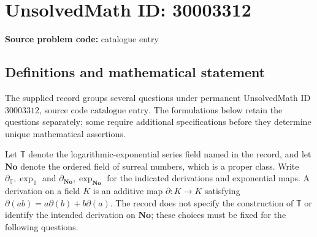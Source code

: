 \documentclass[11pt]{article}
\begin{document}
\section*{UnsolvedMath ID: 30003312}
\textbf{Source problem code:} catalogue entry
\subsection{Definitions and mathematical statement}
The supplied record groups several questions under permanent UnsolvedMath ID \(30003312\), source code \(\text{catalogue entry}\). The formulations below retain the questions separately; some require additional specifications before they determine unique mathematical assertions.

Let \(\mathbb T\) denote the logarithmic-exponential series field named in the record, and let \(\mathbf{No}\) denote the ordered field of surreal numbers, which is a proper class. Write \(\partial_{\mathbb T},\exp_{\mathbb T}\) and \(\partial_{\mathbf{No}},\exp_{\mathbf{No}}\) for the indicated derivations and exponential maps. A derivation on a field \(K\) is an additive map \(\partial:K\to K\) satisfying \(\partial(ab)=a\partial(b)+b\partial(a)\). The record does not specify the construction of \(\mathbb T\) or identify the intended derivation on \(\mathbf{No}\); these choices must be fixed for the following questions.
\end{document}
